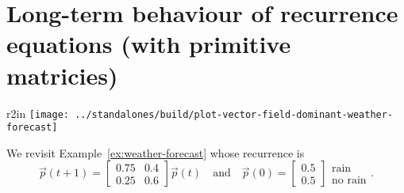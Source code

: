 \documentclass[../main.tex]{subfiles}
\begin{document}
 \section{Long-term behaviour of recurrence equations (with primitive matricies)}

\begin{wrapfigure}[9]{r}{2in}
  \texttt{[image: ../standalones/build/plot-vector-field-dominant-weather-forecast]}
\end{wrapfigure}
We revisit Example~\ref{ex:weather-forecast} whose recurrence is
\[
  \vec{p}(t+1) = 
  \begin{bmatrix}
    0.75 & 0.4 \\
    0.25 & 0.6
  \end{bmatrix}
  \vec{p}(t)
  \quad\text{and}\quad
  \vec{p}(0) = 
  \begin{bmatrix}
    0.5 \\ 0.5
  \end{bmatrix}
  \begin{array}{r}
    \text{rain} \\
    \text{no rain}
  \end{array}.
\]
\end{document}
